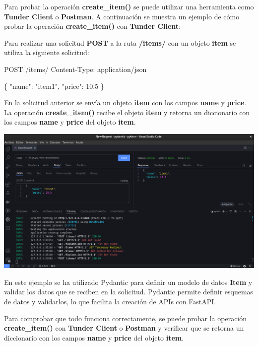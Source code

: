 \documentclass[
  a4paper,
  DIV=11,
  numbers=noendperiod,
  onepage,
  openany]{scrreprt}
\newenvironment{Shaded}{\begin{snugshade}}{\end{snugshade}}
\newcommand{\NormalTok}[1]{\textcolor[rgb]{0.00,0.23,0.31}{#1}}
\begin{document}
Para probar la operación \textbf{create\_item()} se puede utilizar una
herramienta como \textbf{Tunder Client} o \textbf{Postman}. A
continuación se muestra un ejemplo de cómo probar la operación
\textbf{create\_item()} con \textbf{Tunder Client}:

Para realizar una solicitud \textbf{POST} a la ruta \textbf{/items/} con
un objeto \textbf{item} se utiliza la siguiente solicitud:

\begin{Shaded}
\begin{Highlighting}[]
\NormalTok{POST /items/}
\NormalTok{Content{-}Type: application/json}

\NormalTok{\{}
\NormalTok{    "name": "item1",}
\NormalTok{    "price": 10.5}
\NormalTok{\}}
\end{Highlighting}
\end{Shaded}

En la solicitud anterior se envía un objeto \textbf{item} con los campos
\textbf{name} y \textbf{price}. La operación \textbf{create\_item()}
recibe el objeto \textbf{item} y retorna un diccionario con los campos
\textbf{name} y \textbf{price} del objeto \textbf{item}.

\includegraphics{unidades/unidad5/images/paste-20.png}

En este ejemplo se ha utilizado Pydantic para definir un modelo de datos
\textbf{Item} y validar los datos que se reciben en la solicitud.
Pydantic permite definir esquemas de datos y validarlos, lo que facilita
la creación de APIs con FastAPI.

Para comprobar que todo funciona correctamente, se puede probar la
operación \textbf{create\_item()} con \textbf{Tunder Client} o
\textbf{Postman} y verificar que se retorna un diccionario con los
campos \textbf{name} y \textbf{price} del objeto \textbf{item}.
\end{document}
